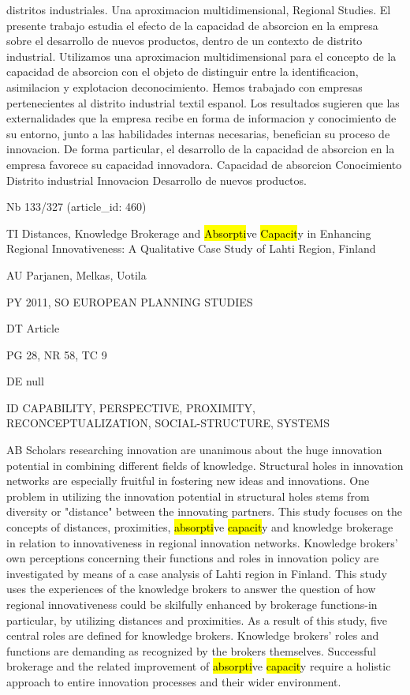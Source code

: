 \documentclass[a4paper]{article}
\begin{document}
distritos industriales. Una aproximacion multidimensional, Regional Studies. El presente trabajo estudia el efecto de la capacidad de absorcion en la empresa sobre el desarrollo de nuevos productos, dentro de un contexto de distrito industrial.
Utilizamos una aproximacion multidimensional para el concepto de la capacidad de absorcion con el objeto de distinguir entre la identificacion, asimilacion y explotacion deconocimiento. Hemos trabajado con empresas pertenecientes al distrito industrial textil espanol. Los resultados sugieren que las externalidades que la empresa recibe en forma de informacion y conocimiento de su entorno, junto a las habilidades internas necesarias, benefician su proceso de innovacion. De forma particular, el desarrollo de la capacidad de absorcion en la empresa favorece su capacidad innovadora. Capacidad de absorcion Conocimiento Distrito industrial Innovacion Desarrollo de nuevos productos.\par
\clearpage

\vspace*{-2cm}
Nb \tabto{0cm}133/327 (article\_id: 460)\par
TI \tabto{0cm}Distances, Knowledge Brokerage and \hl{Absorpti}ve \hl{Capacit}y in Enhancing Regional Innovativeness: A Qualitative Case Study of Lahti Region, Finland\par
AU \tabto{0cm}Parjanen, Melkas, Uotila\par
PY \tabto{0cm}2011, SO EUROPEAN PLANNING STUDIES\par
DT \tabto{0cm}Article\par
PG \tabto{0cm}28, NR 58, TC 9\par
DE \tabto{0cm}null\par
ID \tabto{0cm}CAPABILITY, PERSPECTIVE, PROXIMITY, RECONCEPTUALIZATION, SOCIAL-STRUCTURE, SYSTEMS\par
AB \tabto{0cm}Scholars researching innovation are unanimous about the huge innovation potential in combining different fields of knowledge. Structural holes in innovation networks are especially fruitful in fostering new ideas and innovations. One problem in utilizing the innovation potential in structural holes stems from diversity or "distance" between the innovating partners. This study focuses on the concepts of distances, proximities, \hl{absorpti}ve \hl{capacit}y and knowledge brokerage in relation to innovativeness in regional innovation networks. Knowledge brokers' own perceptions concerning their functions and roles in innovation policy are investigated by means of a case analysis of Lahti region in Finland. This study uses the experiences of the knowledge brokers to answer the question of how regional innovativeness could be skilfully enhanced by brokerage functions-in particular, by utilizing distances and proximities. As a result of this study, five central roles are defined for knowledge brokers. Knowledge brokers' roles and functions are demanding as recognized by the brokers themselves. Successful brokerage and the related improvement of \hl{absorpti}ve \hl{capacit}y require a holistic approach to entire innovation processes and their wider environment.\par
\clearpage
\end{document}
